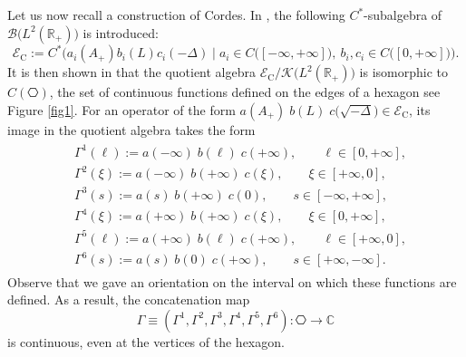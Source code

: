 \documentclass[11pt]{article}
\def\B{\mathscr B}
\def\C{\mathbb C}
\def\EEC{\mathscr E_{\mathrm C}}
\def\K{\mathscr K}
\def\R{\mathbb R}
\begin{document}
Let us now recall a construction of Cordes. 
In \cite[Sec.~V.7]{Cordes}, the following $C^*$-subalgebra
of $\B\big(L^2(\R_+)\big)$ is introduced: 
$$
\EEC:=C^*\Big(a_i(A_+)b_i(L)c_i(-\Delta)\mid a_i\in C\big([-\infty,+\infty]\big), \ b_i,c_i\in C\big([0,+ \infty]\big)\Big).
$$ 
It is then shown in \cite[Thm.~V.7.3]{Cordes} that the quotient algebra $\EEC/\K\big(L^2(\R_+)\big)$ is isomorphic to $C( \hexagon)$, the set of continuous functions defined on the edges of a hexagon
see Figure \ref{fig1}. 
For an operator of the form  
$a(A_+)\;\!b(L)\;\!c\big(\sqrt{-\Delta}\big) \in \EEC$, 
its image in the quotient algebra takes the form
\begin{align}\label{eq:6c}
\begin{split}
&\Gamma^{1}(\ell):=a(-\infty)\;\!b(\ell)\;\!c(+\infty), \qquad \ell \in [0,+\infty], \\
&\Gamma^{2}(\xi):=a(-\infty)\;\!b(+\infty)\;\!c(\xi), \qquad \xi \in [+\infty,0], \\
&\Gamma^{3}(s):=a(s)\;\!b(+\infty)\;\!c(0), \qquad s\in [-\infty, +\infty], \\
&\Gamma^{4}(\xi):=a(+\infty)\;\!b(+\infty)\;\!c(\xi), \qquad \xi \in [0,+\infty], \\
&\Gamma^{5}(\ell):=a(+\infty)\;\!b(\ell)\;\!c(+\infty), \qquad \ell\in [+\infty,0], \\
&\Gamma^{6}(s):=a(s)\;\!b(0)\;\!c(+\infty), \qquad s\in [+\infty, -\infty].
\end{split}
\end{align}
Observe that we gave an orientation on the interval on which these functions are
defined. As a result, the concatenation map
$$
\Gamma\equiv (\Gamma^{1},\Gamma^{2},\Gamma^{3},\Gamma^{4},\Gamma^{5},\Gamma^{6}): \hexagon \to \C
$$
is continuous, even at the vertices of the hexagon.
\end{document}
